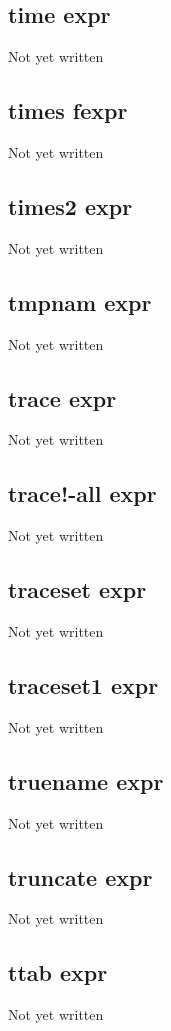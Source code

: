 \documentclass[a4paper,11pt]{article}
\begin{document}
{\subsection{\ttfamily time expr}
   Not yet written

\subsection{\ttfamily times fexpr}
   Not yet written

\subsection{\ttfamily times2 expr}
   Not yet written

\subsection{\ttfamily tmpnam expr}
   Not yet written

\subsection{\ttfamily trace expr}
   Not yet written

\subsection{\ttfamily trace!-all expr}
   Not yet written

\subsection{\ttfamily traceset expr}
   Not yet written

\subsection{\ttfamily traceset1 expr}
   Not yet written

\subsection{\ttfamily truename expr}
   Not yet written

\subsection{\ttfamily truncate expr}
   Not yet written

\subsection{\ttfamily ttab expr}
   Not yet written

}
\end{document}

